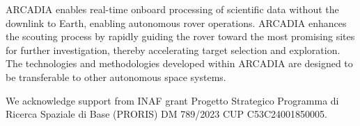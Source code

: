 \documentclass[11pt,twoside]{article}
\begin{document}
ARCADIA enables real-time onboard processing of scientific data without the downlink to Earth, enabling autonomous rover operations. ARCADIA enhances the scouting process by rapidly guiding the rover toward the most promising sites for further investigation, thereby accelerating target selection and exploration. The technologies and methodologies developed within ARCADIA are designed to be transferable to other autonomous space systems.

\acknowledgements We acknowledge support from INAF grant Progetto Strategico Programma di Ricerca Spaziale di Base (PRORIS) DM 789/2023 CUP C53C24001850005.


\end{document}
